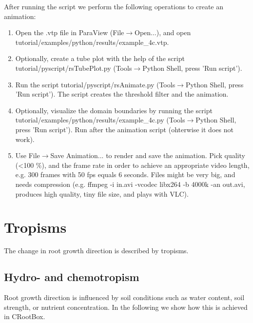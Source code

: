 \documentclass[a4paper]{article}
\begin{document}
After running the script we perform the following operations to create an animation:
\begin{enumerate}
 \item Open the .vtp file in ParaView (File$\rightarrow$Open...), and open tutorial/examples/python/results/example\_4c.vtp.
 \item Optionally, create a tube plot with the help of the script tutorial/pyscript/rsTubePlot.py (Tools$\rightarrow$Python Shell, press 'Run script').
 \item Run the script tutorial/pyscript/rsAnimate.py (Tools$\rightarrow$Python Shell, press 'Run script'). The script creates the threshold filter and the animation. 
 \item Optionally, visualize the domain boundaries by running the script tutorial/examples/python/results/example\_4c.py (Tools$\rightarrow$Python Shell, press 'Run script'). Run after the animation script (ohterwise it does not work).  
 \item Use File$\rightarrow$Save Animation... to render and save the animation. Pick quality (<100 \%), and the frame rate in order to achieve an appropriate video length, e.g. 300 frames with 50 fps equals 6 seconds. Files might be very big, and needs compression (e.g. ffmpeg -i in.avi -vcodec libx264 -b 4000k -an out.avi, produces high quality, tiny file size, and plays with VLC).
\end{enumerate}



\section{Tropisms} %

The change in root growth direction is described by tropisms. 


\subsection{Hydro- and chemotropism} \label{sec:hydro}

Root growth direction is influenced by soil conditions such as water content, soil strength, or nutrient concentration. 
In the following we show how this is achieved in CRootBox.


\end{document}
